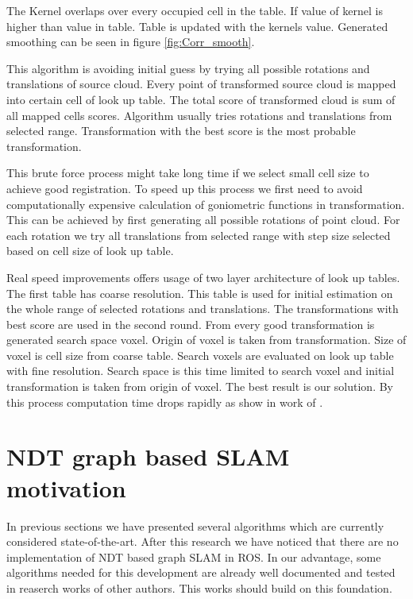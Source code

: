  The Kernel overlaps over every occupied cell in the table. If value of kernel is higher than value in table. Table is updated with the kernels value. Generated smoothing can be seen in figure \ref{fig:Corr_smooth}. 
 
 This algorithm is avoiding initial guess by trying all possible rotations and translations of source cloud. Every point of transformed source cloud is mapped into certain cell of look up table. The total score of transformed cloud is sum of all mapped cells scores. Algorithm usually tries rotations and translations from selected range. Transformation with the best score is the most probable transformation.
 
 This brute force process might take long time if we select small cell size to achieve good registration. To speed up this process we first need to avoid computationally expensive calculation of goniometric functions in transformation. This can be achieved by first generating all possible rotations of point cloud. For each rotation we try all translations from selected range with step size selected based on cell size of look up table.
 
 Real speed improvements offers usage of two layer architecture of look up tables. The first table has coarse resolution. This table is used for initial estimation on the whole range of selected rotations and translations. The transformations with best score are used in the second round. From every good transformation is generated search space voxel. Origin of voxel is taken from transformation. Size of voxel is cell size from coarse table. Search voxels are evaluated on look up table with fine resolution. Search space is this time limited to search voxel and initial transformation is taken from origin of voxel. The best result is our solution. By this process computation time drops rapidly as show in work of \cite{olson2009real}.     
    
\newpage
\section{NDT graph based SLAM motivation}
\label{subsec:analyses}
In previous sections we have presented several algorithms which are currently considered state-of-the-art. After this research we have noticed that there are no implementation of \gls{NDT} based graph \gls{SLAM} in \gls{ROS}. In our advantage, some algorithms needed for this development are already well documented and tested in reaserch works of other authors. This works should build on this foundation. 

